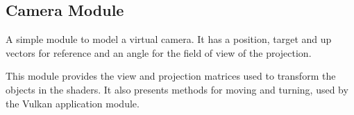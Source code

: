 \subsection{Camera Module}
A simple module to model a virtual camera. It has a position, target and up vectors for reference and an angle for the field of view of the projection.

This module provides the view and projection matrices used to transform the objects in the shaders. It also presents methods for moving and turning, used by the Vulkan application module.
